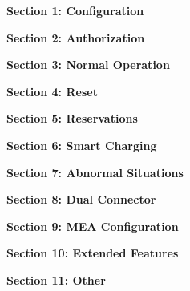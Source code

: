 \documentclass{article}
\begin{document}
\newpage

\newcommand{\includeSection}[2]{
    \newpage
    \thispagestyle{empty}
    \begin{center} \Huge \textbf{Section #1: #2} \end{center}
    \vspace*{\fill}
    \newpage
    
}

\includeSection{1}{Configuration}
\includeSection{2}{Authorization}
\includeSection{3}{Normal Operation}
\includeSection{4}{Reset}
\includeSection{5}{Reservations}
\includeSection{6}{Smart Charging}
\includeSection{7}{Abnormal Situations}
\includeSection{8}{Dual Connector}
\includeSection{9}{MEA Configuration}
\includeSection{10}{Extended Features}
\includeSection{11}{Other}
\end{document}
